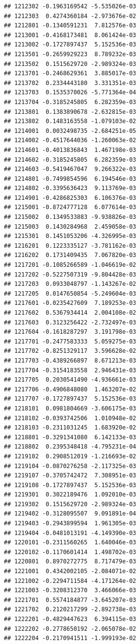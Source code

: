 \begin{frame}[fragile]
\begin{verbatim}
## 1212302 -0.1963169542 -5.535026e-03
## 1212303  0.4274360184 -2.973676e-02
## 1212801 -0.1340591231  7.812576e-03
## 1213001 -0.4168173481  8.061424e-03
## 1213002 -0.1727897437  5.152536e-03
## 1213501 -0.2659929223  8.789232e-03
## 1213502  0.1515629720 -2.989324e-03
## 1213701 -0.2468629361  3.885017e-03
## 1213702  0.2334443180  3.331351e-03
## 1213703  0.1535370026 -5.771364e-04
## 1213704 -0.3185245805  6.282359e-03
## 1213801  0.1383890678 -2.632815e-03
## 1213802  0.1483163558 -1.079103e-02
## 1214001  0.0032498735 -2.684251e-05
## 1214002 -0.4517644036 -1.260063e-02
## 1214601 -0.4013836843  1.467198e-03
## 1214602 -0.3185245805  6.282359e-03
## 1214603 -0.5419467047  9.266322e-03
## 1214801 -0.7499854596  6.194546e-03
## 1214802 -0.3395636423  9.113769e-03
## 1214901 -0.4286825303  6.106376e-03
## 1215001 -0.8724777128  6.077614e-03
## 1215002  0.1349533883 -9.938826e-03
## 1215003  0.1430284968  2.459058e-03
## 1215301  0.1451053206 -4.326995e-03
## 1216201  0.1223335127 -3.781162e-03
## 1216202  0.1731409435  7.067820e-03
## 1217201 -0.1085266589 -1.046619e-02
## 1217202 -0.5227507319 -9.804428e-03
## 1217203  0.0933048797 -1.143267e-02
## 1217205  0.0147650854 -5.249604e-03
## 1217601 -0.0235427609  7.189253e-03
## 1217602  0.5367934414  2.004108e-02
## 1217603  0.3123256422 -2.732497e-03
## 1217604 -0.1618287297  3.191798e-03
## 1217701 -0.2477583333  5.059275e-03
## 1217702 -0.8251329117  3.596628e-02
## 1217703 -0.4389266897  8.671213e-03
## 1217704 -0.3154183558  2.946431e-03
## 1217705  0.2030541490 -4.936661e-03
## 1217706 -0.4906848080  1.463207e-02
## 1217707 -0.1727897437  5.152536e-03
## 1218101  0.0981804669 -3.606175e-03
## 1218102 -0.0393742506  1.010948e-02
## 1218103 -0.2311031245  1.683920e-02
## 1218801 -0.3291341080  6.142133e-03
## 1218802  0.2395348418 -4.795231e-04
## 1219102  0.2908512019 -1.216693e-02
## 1219104 -0.0870276258 -2.117325e-03
## 1219107 -0.3705742472  7.308951e-03
## 1219108 -0.1727897437  5.152536e-03
## 1219301  0.3022189476  1.092010e-03
## 1219302  0.1515629720 -2.989324e-03
## 1219402 -0.3128095507  9.091891e-04
## 1219403 -0.2943899594  1.961305e-03
## 1219404 -0.0481013191 -4.149390e-03
## 1220101 -0.2311560265  1.640046e-03
## 1220102 -0.1170601414  1.498702e-03
## 1220801  0.8970272775  8.717479e-03
## 1221001  0.4342002105 -2.084071e-02
## 1221002 -0.2294711584 -4.171264e-02
## 1221003 -0.3208312370  3.466066e-03
## 1221701  0.5574184877 -3.645207e-03
## 1221702  0.2120217299 -2.892738e-03
## 1222201 -0.4829447623  6.394115e-03
## 1222202 -0.2778650192 -2.065078e-02
## 1222204 -0.2170941511 -1.999193e-02

\end{verbatim}
\end{frame}
